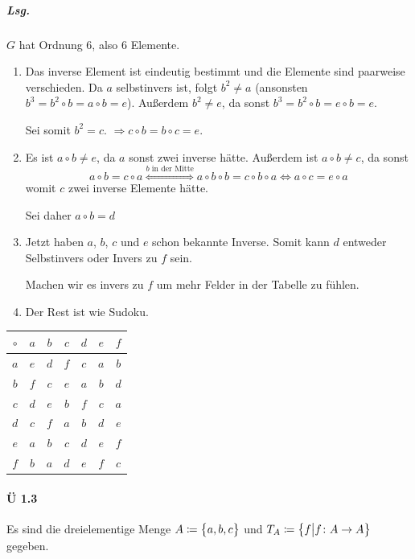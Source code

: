 \documentclass{scrreprt}
\begin{document}
\subparagraph{Lsg.} $G$ hat Ordnung 6, also 6 Elemente.

\begin{enumerate}[(1)]
\item Das inverse Element ist eindeutig bestimmt und die Elemente sind paarweise
  verschieden.
  Da $a$ selbstinvers ist, folgt $b^2 \ne a$
  (ansonsten $b^3 = b^2 \circ b = a \circ b = e$).
  Außerdem $b^2 \ne e$, da sonst $b^3 = b^2 \circ b = e \circ b = e$.

  Sei somit $b^2 = c$. $\Rightarrow c \circ b = b \circ c = e$.

\item Es ist $a \circ b \ne e$, da $a$ sonst zwei inverse hätte.
  Außerdem ist $a \circ b \ne c$, da sonst
  \[
    a \circ b = c \circ a \overset{b\text{ in der Mitte}}\iff
    a \circ b \circ b = c \circ b \circ a \iff
    a \circ c = e \circ a
  \]
  womit $c$ zwei inverse Elemente hätte.

  Sei daher $a \circ b = d$

\item Jetzt haben $a$, $b$, $c$ und $e$ schon bekannte Inverse.
  Somit kann $d$ entweder Selbstinvers oder Invers zu $f$ sein.

  Machen wir es invers zu $f$ um mehr Felder in der Tabelle zu fühlen.

\item Der Rest ist wie Sudoku.
\end{enumerate}

\begin{tabular}{c|cccccc}
  $\circ$ & $a$ & $b$ & $c$ & $d$ & $e$ & $f$ \\
  \hline
  $a$ & $e$ & $d$ & $f$ & $c$ & $a$ & $b$ \\
  $b$ & $f$ & $c$ & $e$ & $a$ & $b$ & $d$ \\
  $c$ & $d$ & $e$ & $b$ & $f$ & $c$ & $a$ \\
  $d$ & $c$ & $f$ & $a$ & $b$ & $d$ & $e$ \\
  $e$ & $a$ & $b$ & $c$ & $d$ & $e$ & $f$ \\
  $f$ & $b$ & $a$ & $d$ & $e$ & $f$ & $c$ \\
\end{tabular}

\paragraph{Ü 1.3} Es sind die dreielementige Menge $A \coloneqq \qty\big{a, b, c}$
und $T_A \coloneqq \qty{f {\big |} f \colon A \to A}$ gegeben.
\end{document}
